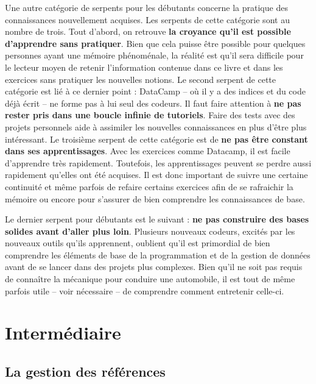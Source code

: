 \documentclass[
  letterpaper,
]{scrbook}
\begin{document}
Une autre catégorie de serpents pour les débutants concerne la pratique
des connaissances nouvellement acquises. Les serpents de cette catégorie
sont au nombre de trois. Tout d'abord, on retrouve \textbf{la croyance
qu'il est possible d'apprendre sans pratiquer}. Bien que cela puisse
être possible pour quelques personnes ayant une mémoire phénoménale, la
réalité est qu'il sera difficile pour le lecteur moyen de retenir
l'information contenue dans ce livre et dans les exercices sans
pratiquer les nouvelles notions. Le second serpent de cette catégorie
est lié à ce dernier point : DataCamp -- où il y a des indices et du
code déjà écrit -- ne forme pas à lui seul des codeurs. Il faut faire
attention à \textbf{ne pas rester pris dans une boucle infinie de
tutoriels}. Faire des tests avec des projets personnels aide à assimiler
les nouvelles connaissances en plus d'être plus intéressant. Le
troisième serpent de cette catégorie est de \textbf{ne pas être constant
dans ses apprentissages}. Avec les exercices comme Datacamp, il est
facile d'apprendre très rapidement. Toutefois, les apprentissages
peuvent se perdre aussi rapidement qu'elles ont été acquises. Il est
donc important de suivre une certaine continuité et même parfois de
refaire certains exercices afin de se rafraichir la mémoire ou encore
pour s'assurer de bien comprendre les connaissances de base.

Le dernier serpent pour débutants est le suivant : \textbf{ne pas
construire des bases solides avant d'aller plus loin}. Plusieurs
nouveaux codeurs, excités par les nouveaux outils qu'ils apprennent,
oublient qu'il est primordial de bien comprendre les éléments de base de
la programmation et de la gestion de données avant de se lancer dans des
projets plus complexes. Bien qu'il ne soit pas requis de connaître la
mécanique pour conduire une automobile, il est tout de même parfois
utile -- voir nécessaire -- de comprendre comment entretenir celle-ci.

\hypertarget{intermuxe9diaire}{%
\section{Intermédiaire}\label{intermuxe9diaire}}

\hypertarget{la-gestion-des-ruxe9fuxe9rences}{%
\subsection{La gestion des
références}\label{la-gestion-des-ruxe9fuxe9rences}}
\end{document}
